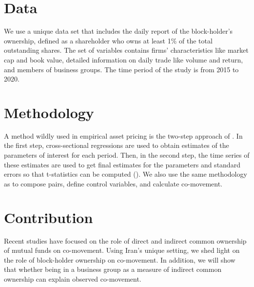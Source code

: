 \documentclass[12pt, a4paper]{article}
\begin{document}
			
			
			
		


\section*{Data}
We use a unique data set that includes the daily report of the block-holder's ownership, defined as a shareholder who owns at least 1\% of the total outstanding shares. The set of variables contains firms' characteristics like market cap and book value, detailed information on daily trade like volume and return, and members of business groups. The time period of the study is from 2015 to 2020.

\section*{Methodology}

A method wildly used in empirical asset pricing is the two-step approach of \cite{FamaMacBeth}. In the first step, cross-sectional regressions
are used to obtain estimates of the parameters of interest for each period. Then, in the second step, the time series of these estimates are used to get final estimates for the parameters and standard errors so that t-statistics can be computed (\cite{skoulakis2008panel}). We also use the same methodology as  \cite{AntonPolk} to compose pairs, define control variables, and calculate co-movement. 


\section*{Contribution}

Recent studies have focused on the role of direct and indirect common ownership of mutual funds on co-movement. Using Iran's unique setting, we shed light on the role of block-holder ownership on co-movement. In addition, we will show that whether being in a business group as a measure of indirect common ownership can explain observed co-movement. 





	












	



	{
	\footnotesize
	
	
}
\end{document}
